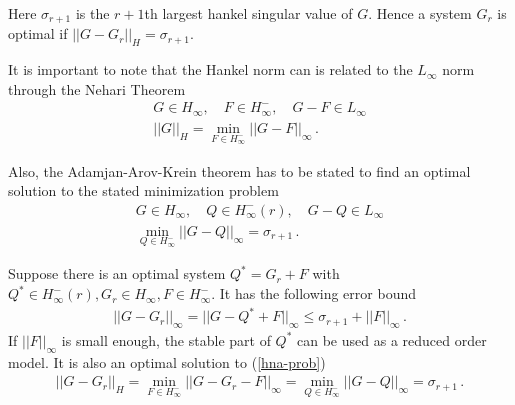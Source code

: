 Here \(\sigma_{r+1}\) is the \(r+1\)th largest hankel singular value of \(G\).
Hence a system \(G_r\) is optimal if \(||G - G_r||_H = \sigma_{r+1}\).

It is important to note that the Hankel norm can is related to the \(L_{\infty}\) norm through the Nehari Theorem
\begin{gather}
G \in H_{\infty}, \quad F \in H_{\infty}^-, \quad G - F \in L_{\infty} \\
||G||_H = \min_{F \in H^{-}_{\infty}} ||G - F||_{\infty} \,.
\end{gather}

Also, the Adamjan-Arov-Krein theorem has to be stated to find an optimal solution to the stated minimization problem
\begin{gather}
G \in H_{\infty}, \quad Q \in H_{\infty}^-(r), \quad G - Q \in L_{\infty} \\
\min_{Q \in H_{\infty}^{-}} ||G-Q||_{\infty} = \sigma_{r+1} \,.
\end{gather}

Suppose there is an optimal system \(Q^{*} = G_r + F\) with \(Q^{*}  \in H_{\infty}^-(r), G_r \in H_{\infty}, F \in H_{\infty}^-\).
It has the following error bound
\begin{gather}
||G - G_r||_{\infty} = ||G - Q^{*} + F||_{\infty} \leq \sigma_{r+1} + ||F||_{\infty}\,. \label{fmin}
\end{gather}
If \(||F||_{\infty}\) is small enough, the stable part of \(Q^{*}\) can be used as a reduced order model.
It is also an optimal solution to (\ref{hna-prob}) 
\cite{sandberg}
\begin{gather}
||G - G_r||_H = \min_{F \in H^{-}_{\infty}} ||G - G_r - F||_{\infty} = \min_{Q \in H_{\infty}^{-}} ||G-Q||_{\infty} = \sigma_{r+1} \,.
\end{gather}


